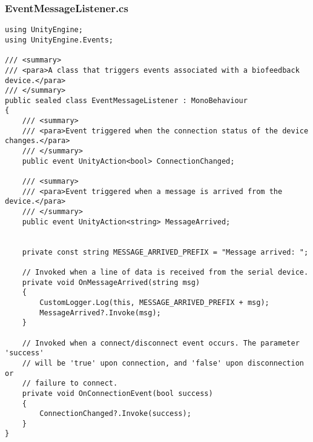 \subsubsection*{EventMessageListener.cs}
\begin{verbatim}
using UnityEngine;
using UnityEngine.Events;

/// <summary>
/// <para>A class that triggers events associated with a biofeedback device.</para>
/// </summary>
public sealed class EventMessageListener : MonoBehaviour
{
    /// <summary>
    /// <para>Event triggered when the connection status of the device changes.</para>
    /// </summary>
    public event UnityAction<bool> ConnectionChanged;

    /// <summary>
    /// <para>Event triggered when a message is arrived from the device.</para>
    /// </summary>
    public event UnityAction<string> MessageArrived;


    private const string MESSAGE_ARRIVED_PREFIX = "Message arrived: ";

    // Invoked when a line of data is received from the serial device.
    private void OnMessageArrived(string msg)
    {
        CustomLogger.Log(this, MESSAGE_ARRIVED_PREFIX + msg);
        MessageArrived?.Invoke(msg);
    }

    // Invoked when a connect/disconnect event occurs. The parameter 'success'
    // will be 'true' upon connection, and 'false' upon disconnection or
    // failure to connect.
    private void OnConnectionEvent(bool success)
    {
        ConnectionChanged?.Invoke(success);
    }
}
\end{verbatim}
